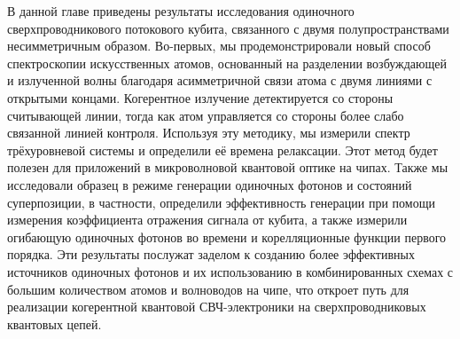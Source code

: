 В данной главе приведены результаты исследования одиночного сверхпроводникового потокового кубита, связанного с двумя полупространствами несимметричным образом. Во-первых, мы продемонстрировали новый способ спектроскопии искусственных атомов, основанный на разделении возбуждающей и излученной волны благодаря асимметричной связи атома с двумя линиями с открытыми концами. Когерентное излучение детектируется со стороны считывающей линии, тогда как атом управляется со стороны более слабо связанной линией контроля. Используя эту методику, мы измерили спектр трёхуровневой системы и определили её времена релаксации. Этот метод будет полезен для приложений в микроволновой квантовой оптике на чипах. Также мы исследовали образец в режиме генерации одиночных фотонов и состояний суперпозиции, в частности, определили эффективность генерации при помощи измерения коэффициента отражения сигнала от кубита, а также измерили огибающую одиночных фотонов во времени и корелляционные функции первого порядка. Эти результаты послужат заделом к созданию более эффективных источников одиночных фотонов и их использованию в комбинированных схемах с большим количеством атомов и волноводов на чипе, что откроет путь для реализации когерентной квантовой СВЧ-электроники на сверхпроводниковых квантовых цепей.